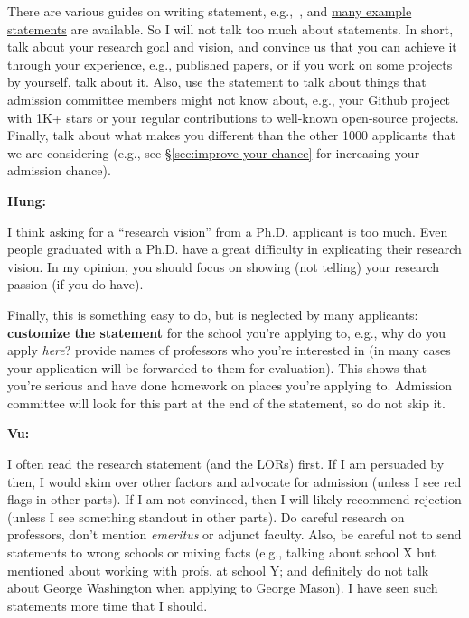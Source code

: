 \documentclass[11pt]{article}
\newenvironment{commentbox}[1][]{
\small
    \begin{mybox}
    {\small \textbf{#1}}
 }{
   \end{mybox}
}
\begin{document}
There are various guides on writing statement, e.g.,~\cite{blattman2022writing}, and \href{https://cs-sop.org/}{many example statements} are available. So I will not talk too much about statements. In short, talk about your research goal and vision, and convince us that you can achieve it through your experience, e.g., published papers, or if you work on some projects by yourself, talk about it. Also, use the statement to talk about things that admission committee members might not know about, e.g., your Github project with 1K+ stars or your regular contributions to well-known open-source projects. Finally, talk about what makes you different than the other 1000 applicants that we are considering (e.g., see \S\ref{sec:improve-your-chance} for increasing your admission chance).



\begin{commentbox}[Hung:]
I think asking for a “research vision” from a Ph.D. applicant is too much. Even people graduated with a Ph.D. have a great difficulty in explicating their research vision. In my opinion, you should focus on showing (not telling) your research passion (if you do have).
\end{commentbox}

Finally, this is something easy to do, but is neglected by many
applicants: \textbf{customize the statement} for the school you're applying to,
e.g., why do you apply \emph{here}? provide names of professors who you're interested in (in many cases your application will be forwarded to them for evaluation).
This shows that you're serious and have done homework on places you're applying to.
Admission committee will look for this part at the end of the statement, so do not skip it.



\begin{commentbox}[Vu:]
I often read the research statement (and the LORs) first. If I am
persuaded by then, I would skim over other factors and advocate for
admission (unless I see red flags in other parts). If I am not
convinced, then I will likely recommend rejection (unless I see
something standout in other parts).
\tcblower
Do careful research on professors, don't mention \emph{emeritus} or  adjunct faculty. 
Also, be careful not to send statements to wrong schools or mixing
facts (e.g., talking about school X but mentioned about working with
profs. at school Y; and definitely do not talk about George Washington when applying to George Mason). I have seen such statements more time that I
should.
\end{commentbox}
\end{document}
